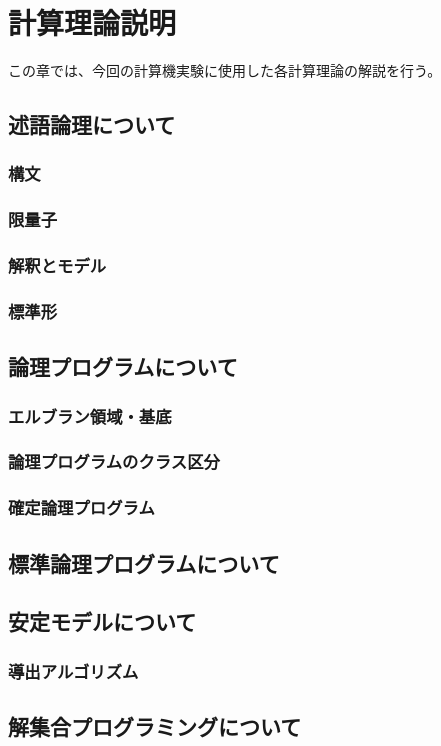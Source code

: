 \documentclass[dvipdfmx]{jsarticle}
\begin{document}
\section{計算理論説明}
この章では、今回の計算機実験に使用した各計算理論の解説を行う。
\subsection{述語論理について}
  \subsubsection{構文}
  \subsubsection{限量子}
  \subsubsection{解釈とモデル}
  \subsubsection{標準形}
\subsection{論理プログラムについて}
  \subsubsection{エルブラン領域・基底}
  \subsubsection{論理プログラムのクラス区分}
  \subsubsection{確定論理プログラム}
\subsection{標準論理プログラムについて}
\subsection{安定モデルについて}
  \subsubsection{導出アルゴリズム}
\subsection{解集合プログラミングについて}
\end{document}
